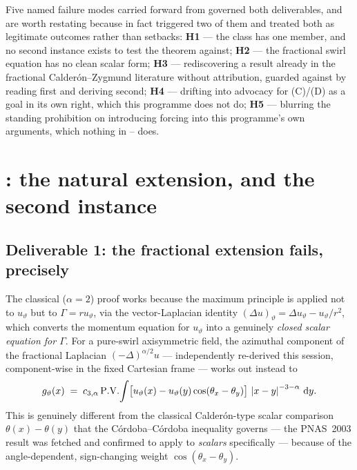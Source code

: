 Five named failure modes carried forward from  governed both
deliverables, and are worth restating because  in fact triggered two of
them and treated both as legitimate outcomes rather than setbacks: \textbf{H1}
--- the class has one member, and no second instance exists to test the
theorem against; \textbf{H2} --- the fractional swirl equation has no clean
scalar form; \textbf{H3} --- rediscovering a result already in the fractional
Calder\'on--Zygmund literature without attribution, guarded against by
reading first and deriving second; \textbf{H4} --- drifting into advocacy for
(C)/(D) as a goal in its own right, which this programme does not do;
\textbf{H5} --- blurring the standing prohibition on introducing forcing into
this programme's own arguments, which nothing in -- does.

\section{\texorpdfstring{: the natural extension, and the second instance}{S62: the natural extension, and the second instance}}
\label{sec:ff-s62}

\subsection{Deliverable 1: the fractional extension fails, precisely}
\label{sec:ff-s62-fractional}

The classical (\(\alpha=2\)) proof works because the maximum principle is
applied not to \(u_\vartheta\) but to \(\Gamma=ru_\vartheta\), via the
vector-Laplacian identity \((\Delta u)_\vartheta=\Delta
u_\vartheta-u_\vartheta/r^2\), which converts the momentum equation for
\(u_\vartheta\) into a genuinely \emph{closed scalar equation for \(\Gamma\)}.
For a pure-swirl axisymmetric field, the azimuthal component of the fractional
Laplacian \((-\Delta)^{\alpha/2}u\) --- independently re-derived this session,
component-wise in the fixed Cartesian frame --- works out instead to
\[
g_\vartheta(x)\;=\;c_{3,\alpha}\,\mathrm{P.V.}\!\int
\bigl[u_\vartheta(x)-u_\vartheta(y)\cos(\theta_x-\theta_y)\bigr]\,
\left|x-y\right|^{-3-\alpha}\,\mathrm{d} y.
\]
This is genuinely different from the classical Calder\'on-type scalar
comparison \(\theta(x)-\theta(y)\) that the C\'ordoba--C\'ordoba inequality
governs --- the PNAS~2003 result was fetched and confirmed to apply to
\emph{scalars} specifically --- because of the angle-dependent,
sign-changing weight \(\cos(\theta_x-\theta_y)\).

